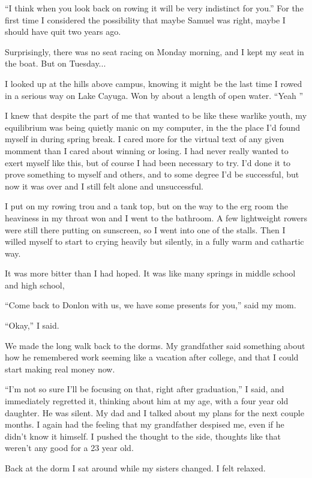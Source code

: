 ``I think when you look back on rowing it will be very indistinct for you.'' For
the first time I considered the possibility that maybe Samuel was right, maybe I
should have quit two years ago.

Surprisingly, there was no seat racing on Monday morning, and I kept my seat in
the boat.  But on Tuesday...


I looked up at the hills above campus, knowing it might be the last time I rowed
in a serious way on Lake Cayuga.  Won by about a length of open water.  ``Yeah
'' 

I knew that despite the part of me that wanted to be like these warlike youth,
my equilibrium was being quietly manic on my computer, in the the place I'd
found myself in during spring break.  I cared more for the virtual text of any
given momment than I cared about winning or losing.  I had never really wanted
to exert myself like this, but of course I had been necessary to try.  I'd done
it to prove something to myself and others, and to some degree I'd be
successful, but now it was over and I still felt alone and unsuccessful.

I put on my rowing trou and a tank top, but on the way to the erg room the
heaviness in my throat won and I went to the bathroom.  A few lightweight
rowers were still there putting on sunscreen, so I went into one of the stalls.
Then I willed myself to start to crying heavily but silently, in a fully warm
and cathartic way.  

It was more bitter than I had hoped.  It was like many springs in middle school
and high school, 

``Come back to Donlon with us, we have some presents for you,'' said my mom. 

``Okay,'' I said.  

We made the long walk back to the dorms.  My grandfather said something about
how he remembered work seeming like a vacation after college, and that I could
start making real money now.

``I'm not so sure I'll be focusing on that, right after graduation,'' I said,
and immediately regretted it, thinking about him at my age, with a four year old
daughter.  He was silent.  My dad and I talked about my plans for the next
couple months.  I again had the feeling that my grandfather despised me, even if
he didn't know it himself.  I pushed the thought to the side, thoughts like that
weren't any good for a 23 year old.

Back at the dorm I sat around while my sisters changed.  I felt relaxed.

